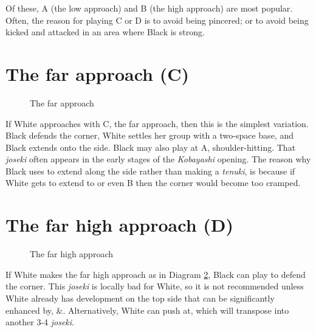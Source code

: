 \documentclass[a5paper,12pt,twoside]{book} %
\newcounter{joseki}                 %
\newcommand{\dref}[1]{Diagram \ref{#1}}
\begin{document}
Of these, A (the low approach) and B (the high approach) are most popular. Often, the reason for playing C or D is to avoid being pincered; or to avoid being kicked and attacked in an area where Black is strong.\\

\section{The far approach (C)}

\begin{figure}[!htbp]
 
\vspace{-0.6cm}\caption{The far approach}
\label{3-4:far-approach}
\end{figure}

If White approaches with C, the far approach, then this is the simplest variation. Black defends the corner, White settles her group with a two-space base, and Black extends onto the side. Black may also play{\large\blackstone[2]} at A, shoulder-hitting{\large\whitestone[1]}. That \textit{joseki} often appears in the early stages of the \textit{Kobayashi} opening. The reason why Black uses{\large\blackstone[4]} to extend along the side rather than making a \textit{tenuki}, is because if White gets to extend to{\large\whitestone[4]} or even B then the corner would become too cramped.\\

\section{The far high approach (D)}

\begin{figure}[!htbp]

\vspace{-0.6cm}\caption{The far high approach}
\label{3-4:far-high-approach}
\end{figure}

If White makes the far high approach as in \dref{3-4:far-high-approach}, Black can play{\large\blackstone[2]} to defend the corner. This \textit{joseki} is locally bad for White, so it is not recommended unless White already has development on the top side that can be significantly enhanced by{\large\whitestone[1]},{\large\whitestone[3]} \&{\large\whitestone[5]}. Alternatively, White can push at{\large\whitestone[4]}, which will transpose into another 3-4 \textit{joseki}.\\
\end{document}
